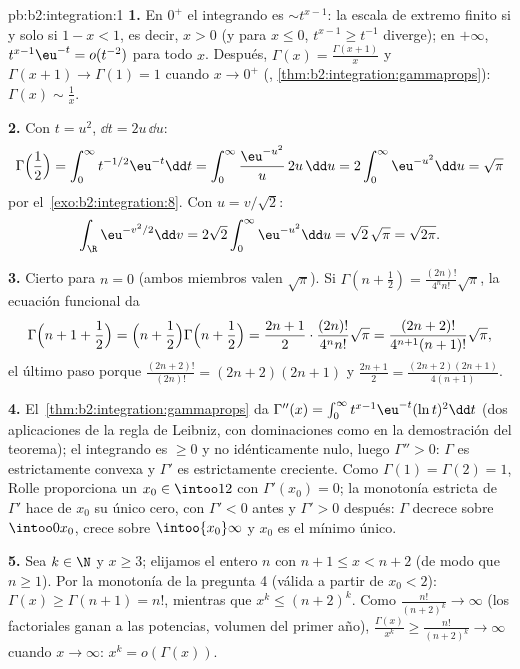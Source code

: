 \begin{solution}{pb:b2:integration:1}
\textbf{1.} En $0^+$ el integrando es $\sim t^{x-1}$: la escala de
extremo finito  si y solo si $1 - x < 1$, es decir, $x >
0$ (y para $x \leq 0$, $t^{x-1} \geq t^{-1}$ diverge); en
$+\infty$, $t^{x-1}\eu^{-t} = o(t^{-2})$  para todo $x$.
Después, $\Gamma(x) = \frac{\Gamma(x+1)}{x}$ y $\Gamma(x+1) \to
\Gamma(1) = 1$ cuando $x \to 0^+$ (,
\cref{thm:b2:integration:gammaprops}): $\Gamma(x) \sim \frac1x$.

\textbf{2.} Con $t = u^2$, $\dd t = 2u\,\dd u$:
\[
\Gamma\Bigl(\frac12\Bigr) = \int_0^\infty
t^{-1/2}\eu^{-t}\dd t
= \int_0^\infty \frac{\eu^{-u^2}}{u}\,2u\,\dd u
= 2\int_0^\infty \eu^{-u^2}\dd u = \sqrt\pi
\]
por el~\cref{exo:b2:integration:8}. Con $u = v/\sqrt2$:
\[
\int_\R \eu^{-v^2/2}\dd v
= 2\sqrt2\int_0^\infty \eu^{-u^2}\dd u
= \sqrt2\,\sqrt\pi = \sqrt{2\pi} .
\]

\textbf{3.} Cierto para $n = 0$ (ambos miembros valen $\sqrt\pi$).
Si $\Gamma(n + \frac12) = \frac{(2n)!}{4^n n!}\sqrt\pi$, la
ecuación funcional da
\[
\Gamma\Bigl(n + 1 + \frac12\Bigr)
= \Bigl(n + \frac12\Bigr)\Gamma\Bigl(n + \frac12\Bigr)
= \frac{2n+1}{2}\cdot\frac{(2n)!}{4^n n!}\sqrt\pi
= \frac{(2n+2)!}{4^{n+1}(n+1)!}\sqrt\pi ,
\]
el último paso porque $\frac{(2n+2)!}{(2n)!} = (2n+2)(2n+1)$ y
$\frac{2n+1}{2} = \frac{(2n+2)(2n+1)}{4(n+1)}$.

\textbf{4.} El~\cref{thm:b2:integration:gammaprops} da $\Gamma''(x)
= \int_0^\infty t^{x-1}\eu^{-t}(\ln t)^2\dd t$ (dos aplicaciones de
la regla de Leibniz, con dominaciones como en la demostración del
teorema); el integrando es $\geq 0$ y no idénticamente nulo, luego
$\Gamma'' > 0$: $\Gamma$ es estrictamente convexa y $\Gamma'$ es
estrictamente creciente. Como $\Gamma(1) = \Gamma(2) = 1$, Rolle
proporciona un $x_0 \in \intoo12$ con $\Gamma'(x_0) = 0$; la
monotonía estricta de $\Gamma'$ hace de $x_0$ su único cero, con
$\Gamma' < 0$ antes y $\Gamma' > 0$ después: $\Gamma$ decrece sobre
$\intoo0{x_0}$, crece sobre $\intoo{x_0}\infty$ y $x_0$ es el
mínimo único.

\textbf{5.} Sea $k \in \N$ y $x \geq 3$; elijamos el entero $n$ con
$n + 1 \leq x < n + 2$ (de modo que $n \geq 1$). Por la monotonía de
la pregunta 4 (válida a partir de $x_0 < 2$): $\Gamma(x) \geq
\Gamma(n + 1) = n!$, mientras que $x^k \leq (n+2)^k$. Como
$\frac{n!}{(n+2)^k} \to \infty$ (los factoriales ganan a las
potencias, volumen del primer año), $\frac{\Gamma(x)}{x^k} \geq
\frac{n!}{(n+2)^k} \to \infty$ cuando $x \to \infty$: $x^k =
o(\Gamma(x))$.


\end{solution}
